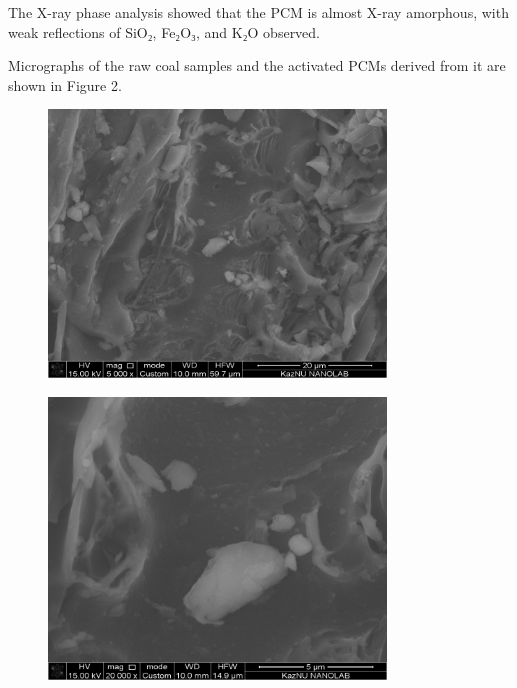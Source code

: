 The X-ray phase analysis showed that the PCM is almost X-ray amorphous,
with weak reflections of SiO₂, Fe₂O₃, and K₂O observed.

Micrographs of the raw coal samples and the activated PCMs derived from
it are shown in Figure 2.

\begin{figure}[H]
	\centering
	\includegraphics[width=0.8\textwidth]{assets/1067}
	\caption*{}
\end{figure}
\begin{figure}[H]
	\centering
	\includegraphics[width=0.8\textwidth]{assets/1068}
	\caption*{}
\end{figure}
